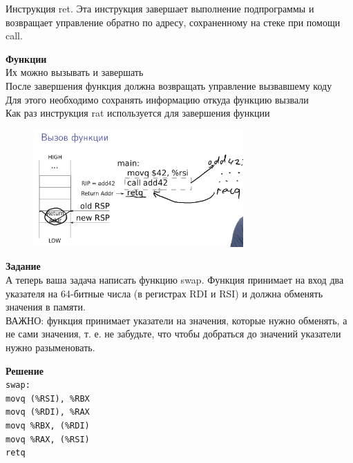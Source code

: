 	\par Инструкция ret. Эта инструкция завершает выполнение подпрограммы и возвращает управление обратно по адресу, сохраненному на стеке при помощи call.
	
	
	
	
	
	\par \textbf{Функции} 
	\\ Их можно вызывать и завершать 
	\\ После завершения функция должна возвращать управление вызвавшему коду
	\\ Для этого необходимо сохранять информацию откуда функцию вызвали
	\\ Как раз инструкция rat используется для завершения функции 
	
	\begin{figure}[h]
		\centering
		\includegraphics[height=4.5cm]{img/3.1} 
		\captionsetup{font=footnotesize} 
		\caption*{} 
	\end{figure}
	
	\par \textbf{Задание}
	\\А теперь ваша задача написать функцию swap. Функция принимает на вход два указателя на 64-битные числа (в регистрах RDI и RSI) и должна обменять значения в памяти.
	\\ВАЖНО: ﻿функция принимает указатели на значения, которые нужно обменять, а не сами значения, т. е. не забудьте, что чтобы добраться до значений указатели нужно разыменовать. 
	
	
	\par \textbf{Решение}
	\\
	\texttt{swap:}
	\\
		\texttt{movq (\%RSI), \%RBX}
		\\
		\texttt{movq (\%RDI), \%RAX}
		\\
		\texttt{movq \%RBX, (\%RDI)}
        \\
		\texttt{movq \%RAX, (\%RSI)}
		\\
		\texttt{retq}
		
